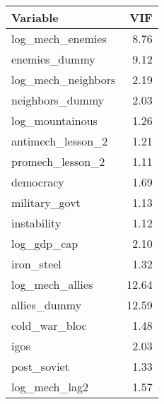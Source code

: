 \documentclass{article}
\begin{document}
\begin{table}[h]
	\centering
	\begin{tabular}{l r}
		\hline
		\textbf{Variable} & \textbf{VIF} \\ 
		\hline
		log\_mech\_enemies & 8.76 \\ 
		enemies\_dummy & 9.12 \\ 
		log\_mech\_neighbors & 2.19 \\ 
		neighbors\_dummy & 2.03 \\ 
		log\_mountainous & 1.26 \\ 
		antimech\_lesson\_2 & 1.21 \\ 
		promech\_lesson\_2 & 1.11 \\ 
		democracy & 1.69 \\ 
		military\_govt & 1.13 \\ 
		instability & 1.12 \\ 
		log\_gdp\_cap & 2.10 \\ 
		iron\_steel & 1.32 \\ 
		log\_mech\_allies & 12.64 \\ 
		allies\_dummy & 12.59 \\ 
		cold\_war\_bloc & 1.48 \\ 
		igos & 2.03 \\ 
		post\_soviet & 1.33 \\ 
		log\_mech\_lag2 & 1.57 \\ 
		\hline
	\end{tabular}
\end{table}
\end{document}
